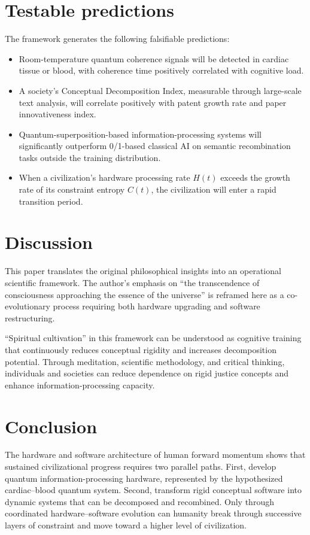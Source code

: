 \documentclass[11pt,a4paper]{article}
\begin{document}
\section{Testable predictions}

The framework generates the following falsifiable predictions:

\begin{itemize}
    \item[P1] Room-temperature quantum coherence signals will be detected in cardiac tissue or blood, with coherence time positively correlated with cognitive load.
    \item[P2] A society's Conceptual Decomposition Index, measurable through large-scale text analysis, will correlate positively with patent growth rate and paper innovativeness index.
    \item[P3] Quantum-superposition-based information-processing systems will significantly outperform 0/1-based classical AI on semantic recombination tasks outside the training distribution.
    \item[P4] When a civilization's hardware processing rate $H(t)$ exceeds the growth rate of its constraint entropy $C(t)$, the civilization will enter a rapid transition period.
\end{itemize}

\section{Discussion}

This paper translates the original philosophical insights into an operational scientific framework. The author's emphasis on ``the transcendence of consciousness approaching the essence of the universe'' is reframed here as a co-evolutionary process requiring both hardware upgrading and software restructuring.

``Spiritual cultivation'' in this framework can be understood as cognitive training that continuously reduces conceptual rigidity and increases decomposition potential. Through meditation, scientific methodology, and critical thinking, individuals and societies can reduce dependence on rigid justice concepts and enhance information-processing capacity.

\section{Conclusion}

The hardware and software architecture of human forward momentum shows that sustained civilizational progress requires two parallel paths. First, develop quantum information-processing hardware, represented by the hypothesized cardiac--blood quantum system. Second, transform rigid conceptual software into dynamic systems that can be decomposed and recombined. Only through coordinated hardware--software evolution can humanity break through successive layers of constraint and move toward a higher level of civilization.
\end{document}
